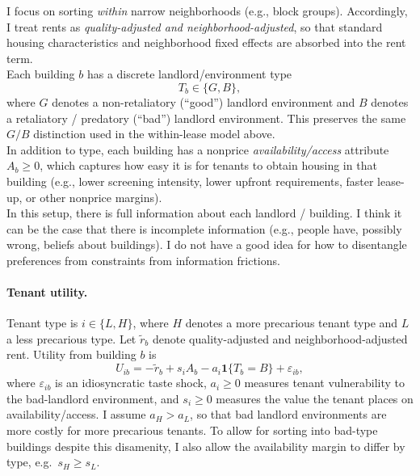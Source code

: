 \documentclass[11pt]{article}
\begin{document}
I focus on sorting \emph{within} narrow neighborhoods (e.g., block groups). Accordingly, I treat rents as \emph{quality-adjusted and neighborhood-adjusted}, so that standard housing characteristics and neighborhood fixed effects are absorbed into the rent term.
\\

Each building $b$ has a discrete landlord/environment type
\[
T_b \in \{G,B\},
\]
where $G$ denotes a non-retaliatory (``good'') landlord environment and $B$ denotes a retaliatory / predatory (``bad'') landlord environment. This preserves the same $G/B$ distinction used in the within-lease model above. 
\\

In addition to type, each building has a nonprice \emph{availability/access} attribute $A_b \ge 0$, which captures how easy it is for tenants to obtain housing in that building (e.g., lower screening intensity, lower upfront requirements, faster lease-up, or other nonprice margins).
\\

In this setup, there is full information about each landlord / building. I think it can be the case that there is incomplete information (e.g., people have, possibly wrong, beliefs about buildings). I do not have a good idea for how to disentangle preferences from constraints from information frictions. 
\\

\paragraph{Tenant utility.}
Tenant type is $i \in \{L,H\}$, where $H$ denotes a more precarious tenant type and $L$ a less precarious type. Let $\tilde r_b$ denote quality-adjusted and neighborhood-adjusted rent. Utility from building $b$ is
\begin{equation}
U_{ib} = - \tilde r_b + s_i A_b - a_i \mathbf{1}\{T_b = B\} + \varepsilon_{ib},
\label{eq:sorting_utility_discrete}
\end{equation}
where $\varepsilon_{ib}$ is an idiosyncratic taste shock, $a_i \ge 0$ measures tenant vulnerability to the bad-landlord environment, and $s_i \ge 0$ measures the value the tenant places on availability/access. I assume $a_H > a_L$, so that bad landlord environments are more costly for more precarious tenants. To allow for sorting into bad-type buildings despite this disamenity, I also allow the availability margin to differ by type, e.g.\ $s_H \ge s_L$.
\\
\end{document}
